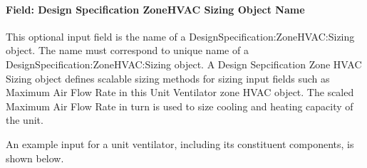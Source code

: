 \paragraph{Field: Design Specification ZoneHVAC Sizing Object Name}\label{field-design-specification-zonehvac-sizing-object-name-2}

This optional input field is the name of a DesignSpecification:ZoneHVAC:Sizing object. The name must correspond to unique name of a DesignSpecification:ZoneHVAC:Sizing object. A Design Sepcification Zone HVAC Sizing object defines scalable sizing methods for sizing input fields such as Maximum Air Flow Rate in this Unit Ventilator zone HVAC object. The scaled Maximum Air Flow Rate in turn is used to size cooling and heating capacity of the unit.

An example input for a unit ventilator, including its constituent components, is shown below.

